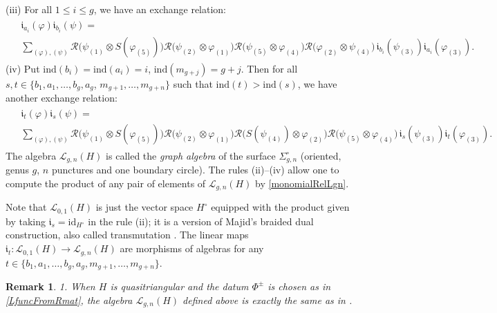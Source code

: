\documentclass[11pt]{amsart}
\newtheorem{remark}[teo]{Remark}
\begin{document}
\smallskip

\noindent (iii) For all $1 \leq i \leq g$, we have an exchange relation:
\begin{align}
\begin{split}\label{L01prodsept25}
&\mathfrak{i}_{a_i}(\varphi)\mathfrak{i}_{b_i}(\psi)=\\
&\sum_{(\varphi),(\psi)}\mathcal{R}\bigl( \psi_{(1)} \otimes S(\varphi_{(5)}) \bigr) \mathcal{R}\bigl( \psi_{(2)} \otimes \varphi_{(1)} \bigr) \mathcal{R}\bigl( \psi_{(5)} \otimes \varphi_{(4)} \bigr) \mathcal{R}\bigl( \varphi_{(2)} \otimes \psi_{(4)} \bigr) \, \mathfrak{i}_{b_i}(\psi_{(3)}) \mathfrak{i}_{a_i}(\varphi_{(3)}).
\end{split}
\end{align}
(iv) Put $\mathrm{ind}(b_i) = \mathrm{ind}(a_i) = i$, $\mathrm{ind}(m_{g+j}) = g+j$. Then for all $s,t \in \{ b_1,a_1, \ldots, b_g,a_g$, $m_{g+1}, \ldots, m_{g+n} \}$ such that $\mathrm{ind}(t) > \mathrm{ind}(s)$, we have another exchange relation:
\begin{align}
\begin{split}\label{braidedTensProdComm}
&\mathfrak{i}_t(\varphi)\mathfrak{i}_s(\psi) =\\
&\sum_{(\varphi),(\psi)} \mathcal{R}\bigl( \psi_{(1)} \otimes S(\varphi_{(5)}) \bigr) \mathcal{R}\bigl( \psi_{(2)} \otimes \varphi_{(1)} \bigr) \mathcal{R}\bigl( S(\psi_{(4)}) \otimes \varphi_{(2)} \bigr) \mathcal{R}\bigl( \psi_{(5)} \otimes \varphi_{(4)} \bigr) \, \mathfrak{i}_s(\psi_{(3)}) \mathfrak{i}_t(\varphi_{(3)}).\!\!\!\!\!\!
\end{split}
\end{align}
\indent The algebra $\mathcal{L}_{g,n}(H)$ is called the {\em graph algebra} of the surface $\Sigma_{g,n}^{\circ}$ (oriented, genus $g$, $n$ punctures and one boundary circle). The rules (ii)--(iv) allow one to compute the product of any pair of elements of $\mathcal{L}_{g,n}(H)$ by \eqref{monomialRelLgn}.

Note that $\mathcal{L}_{0,1}(H)$ is just the vector space $H^{\circ}$ equipped with the product given by taking $\mathfrak{i}_s = \mathrm{id}_ {H^\circ}$ in the rule (ii); it is a version of Majid's braided dual construction, also called transmutation \cite{Majid0,Majid}. The linear maps $\mathfrak{i}_t : \mathcal{L}_{0,1}(H) \to \mathcal{L}_{g,n}(H)$ are morphisms of algebras for any $t \in \bigl\{ b_1,a_1,\ldots,b_g,a_g,m_{g+1},\ldots,m_{g+n} \bigr\}$. 

\begin{remark}
{\rm 1. When $H$ is quasitriangular and the datum $\Phi^{\pm}$ is chosen as in \eqref{LfuncFromRmat}, the algebra $\mathcal{L}_{g,n}(H)$ defined above is exactly the same as in \cite{BFR}.}
\end{remark}
\end{document}
